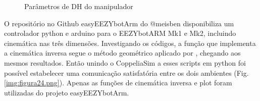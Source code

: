 \begin{figure}[!htbp]
\centering
    \caption{\label{img:figura23b} Parâmetros de DH do manipulador}
    \vspace{1.5em}
\label{fig:dag}
\end{figure}

O repositório no Github easyEEZYbotArm do @meisben \cite{MoneyCoomes2021} disponibiliza um controlador python e arduino para o EEZYbotARM Mk1 e Mk2, incluindo cinemática nas três dimensões. Investigando os códigos, a função que implementa a cinemática inversa segue o método geométrico aplicado por \cite{costa2017}, chegando aos mesmos resultados. Então unindo o CoppeliaSim a esses scripts em python foi possível estabelecer uma comunicação satisfatória entre os dois ambientes (Fig. \ref{img:figura24.png}). Apenas as funções de cinemática inversa e plot foram utilizadas do projeto easyEEZYbotArm. 

